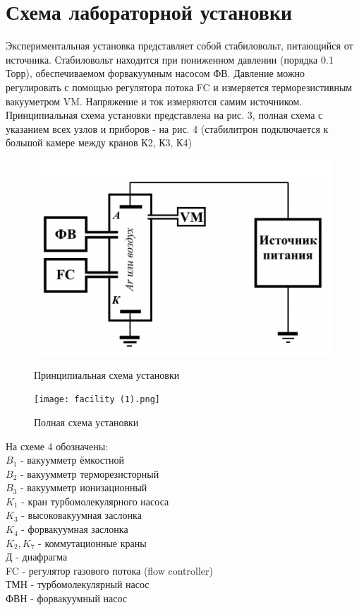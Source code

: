 \documentclass[a4paper]{article}
\begin{document}
\section{Схема лабораторной установки}

Экспериментальная установка представляет собой стабиловольт, питающийся от источника. Стабиловольт находится при пониженном давлении (порядка 0.1 Торр), обеспечиваемом
форвакуумным насосом ФВ. Давление можно регулировать с помощью регулятора потока
FC и измеряется терморезистивным вакууметром VM. Напряжение и ток измеряются самим
источником. Принципиальная схема установки представлена на рис. 3, полная схема с указанием всех узлов и приборов - на рис. 4 (стабилитрон подключается к большой камере между кранов К2, К3, К4)

\begin{figure}[H]
\begin{center}
\begin{minipage}[h]{0.45\linewidth}
\includegraphics[width=1\linewidth]{setup.PNG}
\caption{Принципиальная схема установки} %
\label{ris:experimoriginal} %
\end{minipage}
\hfill 
\begin{minipage}[H]{0.5\linewidth}
\texttt{[image: facility (1).png]}
\caption{Полная схема установки}
\label{ris:experimcoded}
\end{minipage}
\end{center}
\end{figure}


На схеме 4 обозначены: \\
$B_1$ - вакуумметр ёмкостной\\
$B_2$ - вакуумметр терморезисторный\\
$B_3$ - вакуумметр ионизационный\\
$K_1$ - кран турбомолекулярного насоса\\
$K_3$ - высоковакуумная заслонка\\
$K_4$ - форвакуумная заслонка\\
$K_2, K_7$ - коммутационные краны\\
Д - диафрагма\\
FC - регулятор газового потока (flow controller)\\
ТМН - турбомолекулярный насос\\
ФВН - форвакуумный насос\\
\end{document}
